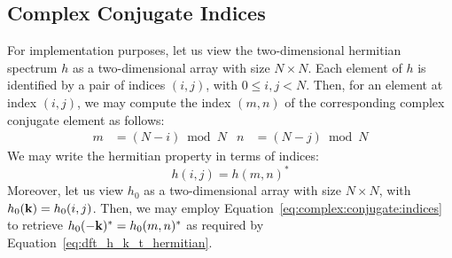 \subsection{Complex Conjugate Indices}
%
For implementation purposes, let us view the two-dimensional hermitian spectrum $h$
as a two-dimensional array with size $N \times N$.
Each element of $h$ is identified by a pair of indices $(i,j)$, with $0\leq i,j <N$. Then, for
an element at index $(i,j)$, we may compute the index $(m,n)$ of the corresponding complex
conjugate element as follows:
\begin{align}
\label{eq:complex:conjugate:indices}
m &= (N - i)\bmod N & n &= (N - j)\bmod N
\end{align}
We may write the hermitian property in terms of indices:
\begin{equation*}
 h(i,j) = h(m,n)^*
\end{equation*}
%
Moreover, let us view $h_0$ as a two-dimensional array with size $N \times N$,
with $h_0(\mathbf{k}) = h_0(i,j)$. Then, we may employ Equation~\ref{eq:complex:conjugate:indices}
to retrieve $h_0(-\mathbf{k})^*=h_0(m,n)^*$ as required by
Equation~\ref{eq:dft_h_k_t_hermitian}.
%

%

%
